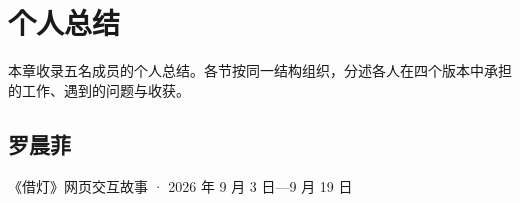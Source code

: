 %
%
%
%
%

\chapter{个人总结}

本章收录五名成员的个人总结。各节按同一结构组织，分述各人在四个版本中承担的工作、遇到的问题与收获。

\section{罗晨菲}

{\small\color{black!55}《借灯》网页交互故事 · 2026 年 9 月 3 日—9 月 19 日\par}

